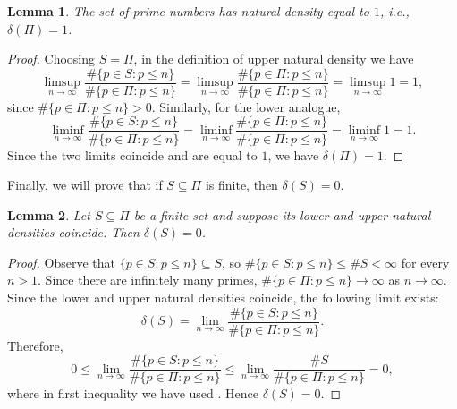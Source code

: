 \documentclass[a4paper,11pt]{article}
\theoremstyle{plain}
\newtheorem{lemma}[lemma]{Lemma}
\begin{document}
    \begin{lemma}
    \label{lemma:Nat3}
        The set of prime numbers has natural density equal to $1$, i.e., $\delta(\Pi)=1$.
    \end{lemma}
    \begin{proof}
        Choosing $S=\Pi$, in the definition of upper natural density we have 
        \begin{equation*}
    		\limsup_{n\rightarrow\infty}\frac{\#\{p\in S: p \leq n\}}{\#\{p\in \Pi: p \leq n\}}=\limsup_{n\rightarrow\infty}\frac{\#\{p\in \Pi: p \leq n\}}{\#\{p\in \Pi: p \leq n\}}=\limsup_{n\rightarrow\infty} 1=1, 
        \end{equation*}
        since $\#\{p\in \Pi: p \leq n\}>0$. Similarly, for the lower analogue,
        \begin{equation*}
    		\liminf_{n\rightarrow\infty}\frac{\#\{p\in S: p \leq n\}}{\#\{p\in \Pi: p \leq n\}}=\liminf_{n\rightarrow\infty}\frac{\#\{p\in \Pi: p \leq n\}}{\#\{p\in \Pi: p \leq n\}}=\liminf_{n\rightarrow\infty} 1=1. 
        \end{equation*} 
        Since the two limits coincide and are equal to $1$, we have $\delta(\Pi)=1$.
    \end{proof}

    Finally, we will prove that if $S\subseteq\Pi$ is finite, then $\delta(S)=0$.
    \begin{lemma}
    \label{lemma:Nat4}
        Let $S\subseteq\Pi$ be a finite set and suppose its lower and upper natural densities coincide. Then $\delta(S)=0$.
    \end{lemma}
    \begin{proof}
       Observe that $\{p\in S: p \leq n\}\subseteq S$, so $\#\{p\in S: p \leq n\}\leq \#S<\infty$ for every $n>1$. Since there are infinitely many primes, $\#\{p\in \Pi: p \leq n\}\to\infty$ as $n\rightarrow\infty$. Since the lower and upper natural densities coincide, the following limit exists:
        \begin{equation*}
            \delta(S)=\lim_{n\rightarrow\infty}\frac{\#\{p\in S: p \leq n\}}{\#\{p\in \Pi: p \leq n\}}.
        \end{equation*}
        Therefore,
        \begin{equation*}
            0\leq\lim_{n\rightarrow\infty}\frac{\#\{p\in S: p \leq n\}}{\#\{p\in \Pi: p \leq n\}}\leq\lim_{n\rightarrow\infty}\frac{\#S}{\#\{p\in \Pi: p \leq n\}}=0,
        \end{equation*}
        where in first inequality we have used . Hence $\delta(S)=0$.
    \end{proof}
    
\end{document}
